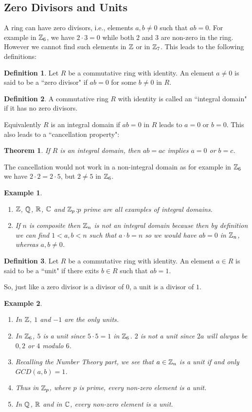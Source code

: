 \documentclass[12pt]{article}
\theoremstyle{plain}
\newtheorem{example}{Example}
\newtheorem{theorem}{Theorem}
\theoremstyle{definition}
\newtheorem{definition}{Definition}
\theoremstyle{remark}
\begin{document}
    \subsection{Zero Divisors and Units}
    A ring can have zero divisors, i.e., elements $a,b \neq 0$ such that $ab=0$. For example in $\mathbb{Z}_6$, we have $2\cdot 3=0$ while both $2$ and $3$ are non-zero in the ring. However we cannot find such elements in $\mathbb{Z}$ or in $\mathbb{Z}_7$. This leads to the following definitions:
    \begin{definition}
    Let $R$ be a commutative ring with identity. An element $a\neq 0$ is said to be a ``zero divisor" if $ab=0$ for some $b\neq 0$ in $R$.
    \end{definition}
    \begin{definition}
    A commutative ring $R$ with identity is called an ``integral domain" if it has no zero divisors.
    \end{definition}
Equivalently $R$ is an integral domain if $ab=0$ in $R$ leads to $a=0$ or $b=0$. This also leads to a ``cancellation property":
\begin{theorem}
If $R$ is an integral domain, then $ab=ac$ implies $a=0$ or $b=c$.
\end{theorem}
The cancellation would not work in a non-integral domain as for example in $\mathbb{Z}_6$ we have $2\cdot 2=2\cdot 5$, but $2\neq 5$ in $\mathbb{Z}_6$.
\begin{example}
\begin{enumerate}
    \item $\mathbb{Z}$, $\mathbb{Q}$, $\mathbb{R}$, $\mathbb{C}$ and $\mathbb{Z}_p$:$p$ prime
 are all examples of integral domains.
 \item If $n$ is composite then $\mathbb{Z}_n$ is not an integral domain because then by definition we can find $1<a,b<n$ such that $a\cdot b=n$ so we would have $ab=0$ in $\mathbb{Z}_n$, whereas $a, b\neq 0$.
 \end{enumerate}
 \end{example}
 \begin{definition}
    Let $R$ be a commutative ring with identity. An element $a\in R$ is said to be a ``unit" if there exits $b\in R$ such that $ab=1$.
 \end{definition}

So,  just like a zero divisor is a divisor of $0$, a unit is a divisor of $1$.

\begin{example}
\begin{enumerate}
    \item In $\mathbb{Z}$, $1$ and $-1$ are the only units.
    \item In $\mathbb{Z}_6$, $5$ is a unit since $5\cdot 5 =1$ in $\mathbb{Z}_6$. $2$ is not a unit since $2a$ will alwyas be $0,2$ or $4$ modulo $6$.
    \item Recalling the Number Theory part, we see that $a\in \mathbb{Z}_n$ is a unit if and only $GCD(a,b)=1$.
    \item Thus in $\mathbb{Z}_p$, where $p$ is prime, every non-zero element is a unit.
    \item In $\mathbb{Q}$, $\mathbb{R}$ and in $\mathbb{C}$, every non-zero element is a unit.
\end{enumerate}
\end{example}
\end{document}

